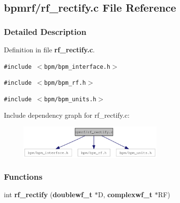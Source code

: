 \subsection{bpmrf/rf\_\-rectify.c File Reference}
\label{rf__rectify_8c}


\subsubsection{Detailed Description}


Definition in file {\bf rf\_\-rectify.c}.

{\tt \#include $<$bpm/bpm\_\-interface.h$>$}\par
{\tt \#include $<$bpm/bpm\_\-rf.h$>$}\par
{\tt \#include $<$bpm/bpm\_\-units.h$>$}\par


Include dependency graph for rf\_\-rectify.c:\nopagebreak
\begin{figure}[H]
\begin{center}
\leavevmode
\includegraphics[width=206pt]{rf__rectify_8c__incl}
\end{center}
\end{figure}
\subsubsection*{Functions}
\begin{CompactItemize}
\item 
int {\bf rf\_\-rectify} ({\bf doublewf\_\-t} $\ast$D, {\bf complexwf\_\-t} $\ast$RF)
\end{CompactItemize}
